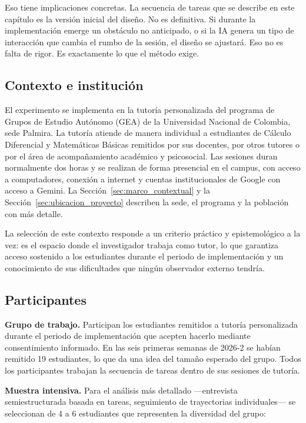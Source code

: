 Eso tiene implicaciones concretas. La secuencia de tareas que se describe en este capítulo es la versión inicial del diseño. No es definitiva. Si durante la implementación emerge un obstáculo no anticipado, o si la IA genera un tipo de interacción que cambia el rumbo de la sesión, el diseño se ajustará. Eso no es falta de rigor. Es exactamente lo que el método exige.

\subsection{Contexto e institución}

El experimento se implementa en la tutoría personalizada del programa de Grupos de Estudio Autónomo (GEA) de la Universidad Nacional de Colombia, sede Palmira. La tutoría atiende de manera individual a estudiantes de Cálculo Diferencial y Matemáticas Básicas remitidos por sus docentes, por otros tutores o por el área de acompañamiento académico y psicosocial. Las sesiones duran normalmente dos horas y se realizan de forma presencial en el campus, con acceso a computadores, conexión a internet y cuentas institucionales de Google con acceso a Gemini. La Sección~\ref{sec:marco_contextual} y la Sección~\ref{sec:ubicacion_proyecto} describen la sede, el programa y la población con más detalle.

La selección de este contexto responde a un criterio práctico y epistemológico a la vez: es el espacio donde el investigador trabaja como tutor, lo que garantiza acceso sostenido a los estudiantes durante el periodo de implementación y un conocimiento de sus dificultades que ningún observador externo tendría.

\subsection{Participantes}

\textbf{Grupo de trabajo.} Participan los estudiantes remitidos a tutoría personalizada durante el periodo de implementación que acepten hacerlo mediante consentimiento informado. En las seis primeras semanas de 2026-2 se habían remitido 19 estudiantes, lo que da una idea del tamaño esperado del grupo. Todos los participantes trabajan la secuencia de tareas dentro de sus sesiones de tutoría.

\textbf{Muestra intensiva.} Para el análisis más detallado ---entrevista semiestructurada basada en tareas, seguimiento de trayectorias individuales--- se seleccionan de 4 a 6 estudiantes que representen la diversidad del grupo:

